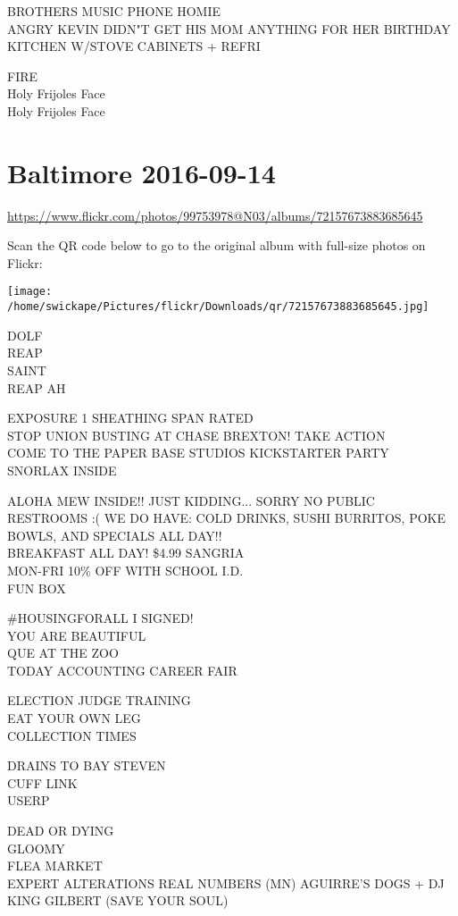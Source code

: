 \documentclass[10pt,letterpaper]{article}
\begin{document}
BROTHERS MUSIC PHONE HOMIE\\
ANGRY KEVIN DIDN"T GET HIS MOM ANYTHING FOR HER BIRTHDAY\\
KITCHEN W/STOVE CABINETS + REFRI

FIRE\\
Holy Frijoles Face\\
Holy Frijoles Face


\section*{Baltimore 2016-09-14}

\url{https://www.flickr.com/photos/99753978@N03/albums/72157673883685645}

Scan the QR code below to go to the original album with full-size photos on Flickr:

\texttt{[image: /home/swickape/Pictures/flickr/Downloads/qr/72157673883685645.jpg]}


DOLF\\
REAP\\
SAINT\\
REAP AH

EXPOSURE 1 SHEATHING SPAN RATED\\
STOP UNION BUSTING AT CHASE BREXTON!   TAKE ACTION\\
COME TO THE PAPER BASE STUDIOS KICKSTARTER PARTY\\
SNORLAX INSIDE

ALOHA MEW INSIDE!! JUST KIDDING...  SORRY NO PUBLIC RESTROOMS :( WE DO HAVE: COLD DRINKS, SUSHI BURRITOS, POKE BOWLS, AND SPECIALS ALL DAY!!\\
BREAKFAST ALL DAY!  \$4.99 SANGRIA\\
MON{-}FRI 10\% OFF WITH SCHOOL I.D.\\
FUN BOX

\#HOUSINGFORALL I SIGNED!\\
YOU ARE BEAUTIFUL\\
QUE AT THE ZOO\\
TODAY ACCOUNTING CAREER FAIR

ELECTION JUDGE TRAINING\\
EAT YOUR OWN LEG\\
COLLECTION TIMES

DRAINS TO BAY STEVEN\\
CUFF LINK\\
USERP

DEAD OR DYING\\
GLOOMY\\
FLEA MARKET\\
EXPERT ALTERATIONS REAL NUMBERS (MN) AGUIRRE'S DOGS + DJ KING GILBERT (SAVE YOUR SOUL)
\end{document}
